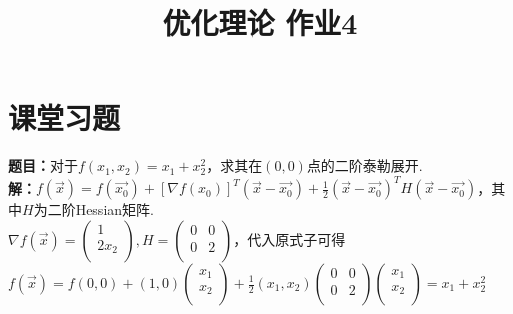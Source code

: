 \documentclass{article}
\title{优化理论 作业4}
\author{}
\date{}
\begin{document}
\section*{课堂习题}
\noindent
\textbf{题目：}对于$f(x_1,x_2)=x_1+x_2^2$，求其在$(0,0)$点的二阶泰勒展开.\\
\textbf{解：}$f(\vec{x})=f(\vec{x_0})+[\nabla f(x_0)]^T(\vec{x}-\vec{x_0})+\frac{1}{2}(\vec{x}-\vec{x_0})^TH(\vec{x}-\vec{x_0})$，其中$H$为二阶Hessian矩阵.\\
$\nabla f(\vec{x}) = \left(
    \begin{array}{c}
        1 \\
        2x_2 \\
    \end{array}
\right),H=\left(
    \begin{array}{cc}
        0 & 0\\
        0 & 2\\
    \end{array}
\right)$，代入原式子可得\\
$f(\vec{x})=f(0,0)+\left(1,0\right)\left(
    \begin{array}{c}
        x_1 \\
        x_2 \\
    \end{array}
\right)+\frac{1}{2}(x_1,x_2)\left(
    \begin{array}{cc}
        0 & 0\\
        0 & 2\\
    \end{array}
\right)\left(
    \begin{array}{c}
        x_1 \\
        x_2 \\
    \end{array}
\right)=x_1+x_2^2$
\end{document}
